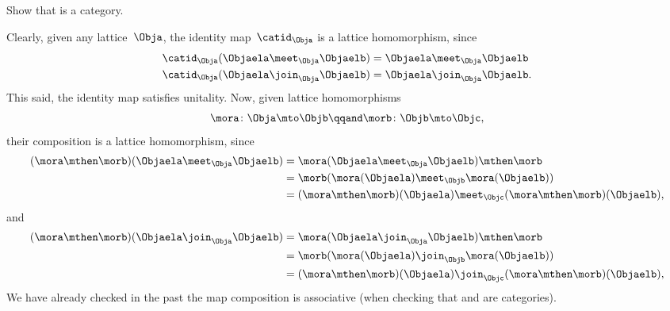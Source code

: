 \begin{exercise}
    \label{ex:lat_is_cat}
    Show that \Lat is a category.
\end{exercise}
\begin{solution}
    Clearly, given any lattice~$\Obja$, the identity map~$\catid_\Obja$ is a lattice homomorphism, since
    \begin{equation*}
        \begin{aligned}
            \catid_\Obja(\Objaela \meet_\Obja \Objaelb) & =\Objaela \meet_\Obja \Objaelb \\
            \catid_\Obja(\Objaela \join_\Obja \Objaelb) & =\Objaela \join_\Obja \Objaelb.
        \end{aligned}
    \end{equation*}
    This said, the identity map satisfies unitality.
    Now, given lattice homomorphisms
    \begin{equation}
        \mora\colon \Obja \mto \Objb
        \qqand
        \morb\colon \Objb\mto \Objc,
    \end{equation}
    their composition is a lattice homomorphism, since
    \begin{equation*}
        \begin{aligned}
            (\mora \mthen \morb)(\Objaela \meet_\Obja \Objaelb)
             & = \mora(\Objaela \meet_\Obja \Objaelb) \mthen \morb \\
             & = \morb(\mora(\Objaela) \meet_\Objb \mora(\Objaelb)) \\
             & =(\mora \mthen \morb)(\Objaela) \meet_\Objc (\mora \mthen \morb)(\Objaelb),
        \end{aligned}
    \end{equation*}
    and
    \begin{equation*}
        \begin{aligned}
            (\mora \mthen \morb)(\Objaela \join_\Obja \Objaelb)
             & = \mora(\Objaela \join_\Obja \Objaelb) \mthen \morb \\
             & = \morb(\mora(\Objaela) \join_\Objb \mora(\Objaelb)) \\
             & =(\mora \mthen \morb)(\Objaela) \join_\Objc (\mora \mthen \morb)(\Objaelb),
        \end{aligned}
    \end{equation*}
    We have already checked in the past the map composition is associative (\eg when checking that \Set and \Pos are categories).
\end{solution}

